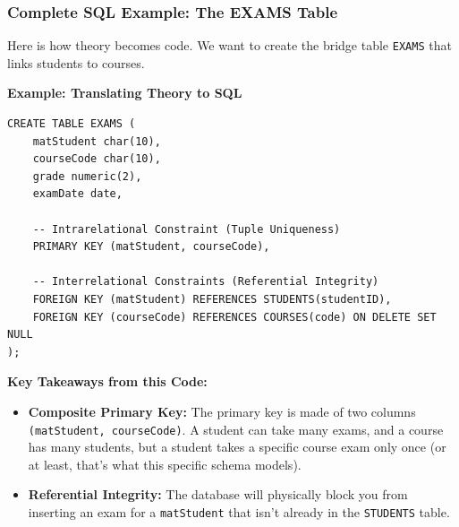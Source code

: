 \subsubsection{Complete SQL Example: The EXAMS Table}
Here is how theory becomes code. We want to create the bridge table \texttt{EXAMS} that links students to courses.

\begin{example}{\textbf{Example: Translating Theory to SQL}}
\begin{verbatim}
CREATE TABLE EXAMS (
    matStudent char(10),
    courseCode char(10),
    grade numeric(2),
    examDate date,
    
    -- Intrarelational Constraint (Tuple Uniqueness)
    PRIMARY KEY (matStudent, courseCode),
    
    -- Interrelational Constraints (Referential Integrity)
    FOREIGN KEY (matStudent) REFERENCES STUDENTS(studentID),
    FOREIGN KEY (courseCode) REFERENCES COURSES(code) ON DELETE SET NULL
);
\end{verbatim}
\textbf{Key Takeaways from this Code:}
\begin{itemize}
    \item \textbf{Composite Primary Key:} The primary key is made of two columns \texttt{(matStudent, courseCode)}. A student can take many exams, and a course has many students, but a student takes a specific course exam only once (or at least, that's what this specific schema models).
    \item \textbf{Referential Integrity:} The database will physically block you from inserting an exam for a \texttt{matStudent} that isn't already in the \texttt{STUDENTS} table.
\end{itemize}
\end{example}